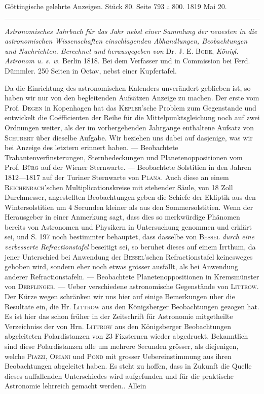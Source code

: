 \clearpage
{}
\hypertarget{native-616-lower}{}
\begin{center}\small Göttingische gelehrte Anzeigen. Stück 80. Seite $793\;\therefore\;800$. 1819 Mai 20.\\[3pt]\rule{.72\linewidth}{.3pt}\end{center}

\emph{Astronomisches Jahrbuch für das Jahr {} nebst einer Sammlung der neuesten in die astronomischen Wissenschaften einschlagenden Abhandlungen, Beobachtungen und Nachrichten. Berechnet und herausgegeben von} Dr. J. E. \textsc{Bode}, \emph{Königl. Astronom u. s. w.} Berlin 1818. Bei dem Verfasser und in Commission bei Ferd. Dümmler. 250 Seiten in Octav, nebst einer Kupfertafel.

Da die Einrichtung des astronomischen Kalenders unverändert geblieben ist, so haben wir nur von den begleitenden Aufsätzen Anzeige zu machen. Der erste vom Prof. \textsc{Degen} in Kopenhagen hat das \textsc{Kepler}'sche Problem zum Gegenstande und entwickelt die Coëfficienten der Reihe für die Mittelpunktsgleichung noch auf zwei Ordnungen weiter, als der im vorhergehenden Jahrgange enthaltene Aufsatz von \textsc{Schubert} über dieselbe Aufgabe. Wir beziehen uns dabei auf dasjenige, was wir bei Anzeige des letztern erinnert haben. --- Beobachtete Trabantenverfinsterungen, Sternbedeckungen und Planetenoppositionen vom Prof. \textsc{Bürg} auf der Wiener Sternwarte. --- Beobachtete Solstitien in den Jahren 1812---1817 auf der Turiner Sternwarte von \textsc{Plana}. Auch diese an einem \textsc{Reichenbach}'schen Multiplicationskreise mit stehender Säule, von 18 Zoll Durchmesser, angestellten Beobachtungen geben die Schiefe der Ekliptik aus den Wintersolstitien um 4 Secunden kleiner als aus den Sommersolstitien. Wenn der Herausgeber in einer Anmerkung sagt, dass dies so merkwürdige Phänomen bereits von Astronomen und Physikern in Untersuchung genommen und erklärt sei, und S. 197 noch bestimmter behauptet, dass dasselbe von \textsc{Bessel} \emph{durch eine verbesserte Refractionstafel} beseitigt sei, so beruhet dieses auf einem Irrthum, da jener Unterschied bei Anwendung der \textsc{Bessel}'schen Refractionstafel keinesweges gehoben wird, sondern eher noch etwas grösser ausfällt, als bei Anwendung anderer Refractionstafeln. --- Beobachtete Planetenoppositionen in Kremsmünster von \textsc{Derflinger}. --- Ueber verschiedene astronomische Gegenstände von \textsc{Littrow}. Der Kürze wegen schränken wir uns hier auf einige Bemerkungen über die Resultate ein, die Hr. \textsc{Littrow} aus den Königsberger Beobachtungen gezogen hat. Es ist hier das schon früher in der Zeitschrift für Astronomie mitgetheilte Verzeichniss der von Hrn. \textsc{Littrow} aus den Königsberger Beobachtungen abgeleiteten Polardistanzen von 23 Fixsternen wieder abgedruckt. Bekanntlich sind diese Polardistanzen alle um mehrere Secunden grösser, als diejenigen, welche \textsc{Piazzi}, \textsc{Oriani} und \textsc{Pond} mit grosser Uebereinstimmung aus ihren Beobachtungen abgeleitet haben. Es steht zu hoffen, dass in Zukunft die Quelle dieses auffallenden Unterschiedes wird aufgefunden und für die praktische Astronomie lehrreich gemacht werden.. Allein 